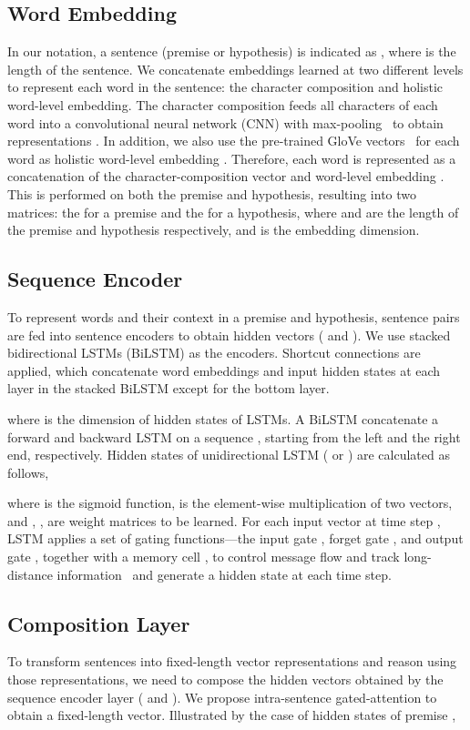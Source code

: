 \documentclass[11pt,letterpaper]{article}
\begin{document}
\subsection{Word Embedding}
In our notation, a sentence (premise or hypothesis) is indicated as , where  is the length of the sentence. We concatenate embeddings learned at two different levels to represent each word in the sentence: the character composition and holistic word-level embedding. The character composition feeds all characters of each word into a convolutional neural network (CNN) with max-pooling~\citep{kim2014convolutional} to obtain representations . In addition, we also use the pre-trained GloVe vectors~\citep{Pennington:D14-1162} for each word as holistic word-level embedding . Therefore, each word is represented as a concatenation of the character-composition vector and word-level embedding . This is performed on both the premise and hypothesis, resulting into two matrices: the  for a premise and the  for a hypothesis, where  and  are the length of the premise and hypothesis respectively, and  is the embedding dimension.

\subsection{Sequence Encoder}
To represent words and their context in a premise and hypothesis, sentence pairs are fed into sentence encoders to obtain hidden vectors ( and ). We use stacked bidirectional LSTMs (BiLSTM) as the encoders. Shortcut connections are applied, which concatenate word embeddings and input hidden states at each layer in the stacked BiLSTM except for the bottom layer.


\noindent where  is the dimension of hidden states of LSTMs.
A BiLSTM concatenate a forward and backward LSTM on a sequence , starting from the left and the right end, respectively. Hidden states of unidirectional LSTM ( or ) are calculated as follows, 


\noindent  where  is the sigmoid function,  is the element-wise multiplication of two vectors, and , ,  are weight matrices to be learned. For each input vector  at time step , LSTM applies a set of gating functions---the input gate , forget gate , and output gate , together with a memory cell , to control message flow and track long-distance information~\citep{DBLP:journals/neco/HochreiterS97} and generate a hidden state  at each time step. 

\subsection{Composition Layer}
To transform sentences into fixed-length vector representations and reason using those representations, we need to compose the hidden vectors obtained by the sequence encoder layer ( and ). We propose intra-sentence gated-attention to obtain a fixed-length vector. Illustrated by the case of hidden states of premise ,
\end{document}
